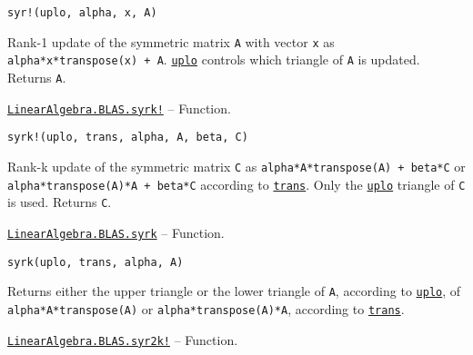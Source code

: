 \begin{adjustwidth}{2em}{0pt}


\begin{verbatim}
syr!(uplo, alpha, x, A)
\end{verbatim}

Rank-1 update of the symmetric matrix \texttt{A} with vector \texttt{x} as \texttt{alpha*x*transpose(x) + A}. \hyperlink{13880289478825450693}{\texttt{uplo}} controls which triangle of \texttt{A} is updated. Returns \texttt{A}.



\end{adjustwidth}
\hypertarget{17626560315865992019}{} 
\hyperlink{17626560315865992019}{\texttt{LinearAlgebra.BLAS.syrk!}}  -- {Function.}

\begin{adjustwidth}{2em}{0pt}


\begin{verbatim}
syrk!(uplo, trans, alpha, A, beta, C)
\end{verbatim}

Rank-k update of the symmetric matrix \texttt{C} as \texttt{alpha*A*transpose(A) + beta*C} or \texttt{alpha*transpose(A)*A + beta*C} according to \hyperlink{15951037910221396131}{\texttt{trans}}. Only the \hyperlink{13880289478825450693}{\texttt{uplo}} triangle of \texttt{C} is used. Returns \texttt{C}.



\end{adjustwidth}
\hypertarget{13051593926705442778}{} 
\hyperlink{13051593926705442778}{\texttt{LinearAlgebra.BLAS.syrk}}  -- {Function.}

\begin{adjustwidth}{2em}{0pt}


\begin{verbatim}
syrk(uplo, trans, alpha, A)
\end{verbatim}

Returns either the upper triangle or the lower triangle of \texttt{A}, according to \hyperlink{13880289478825450693}{\texttt{uplo}}, of \texttt{alpha*A*transpose(A)} or \texttt{alpha*transpose(A)*A}, according to \hyperlink{15951037910221396131}{\texttt{trans}}.



\end{adjustwidth}
\hypertarget{4077074915146270084}{} 
\hyperlink{4077074915146270084}{\texttt{LinearAlgebra.BLAS.syr2k!}}  -- {Function.}

